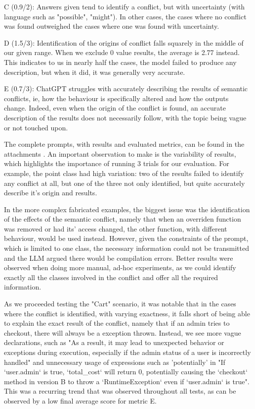 C (0.9/2): Answers given tend to identify a conflict, but with uncertainty (with language such as "possible", "might"). In other cases, the cases where no conflict was found outweighed the cases where one was found with uncertainty.

D (1.5/3): Identification of the origins of conflict falls squarely in the middle of our given range.  When we exclude 0 value results, the average is 2.77 instead. This indicates to us in nearly half the cases, the model failed to produce any description, but when it did, it was generally very accurate.

E (0.7/3): ChatGPT struggles with accurately describing the results of semantic conflicts, ie, how the behaviour is specifically altered and how the outputs change. Indeed, even when the origin of the conflict is found, an accurate description of the results does not necessarily follow, with the topic being vague or not touched upon.

The complete prompts, with results and evaluated metrics, can be found in the attachments .
An important observation to make is the variability of results, which highlights the importance of running 3 trials for our evaluation.
For example, the point class had high variation: two of the results failed to identify any conflict at all, but one of the three not only identified, but quite accurately describe it's origin and results.

In the more complex fabricated examples, the biggest issue was the identification of the effects of the semantic conflict, namely that when an overriden function was removed or had its' access changed, the other function, with different behaviour, would be used instead. However, given the constraints of the prompt, which is limited to one class, the necessary information could not be transmitted and the LLM argued there would be compilation errors. 
Better results were observed when doing more manual, ad-hoc experiments, as we could identify exactly all the classes involved in the conflict and offer all the required information.

As we proceeded testing the "Cart" scenario, it was notable that in the cases where the conflict is identified, with varying exactness, it falls short of being able to explain the exact result of the conflict, namely that if an admin tries to checkout, there will always be a exception thrown. Instead, we see more vague declarations, such as "As a result, it may lead to unexpected behavior or exceptions during execution, especially if the admin status of a user is incorrectly handled" and unnecessary usage of expressions such as 'potentially' in "If `user.admin` is true, `total\_cost` will return 0, potentially causing the `checkout` method in version B to throw a `RuntimeException` even if `user.admin` is true".
This was a recurring trend that was observed throughout all tests, as can be observed by a low final average score for metric E.

